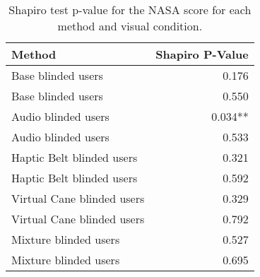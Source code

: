 
\begin{table}[!htb]
\centering
\caption{Shapiro test p-value for the NASA score for each method and visual condition.}
\label{tab:shapiro_nasa_score}
\begin{tabular}{lr}
\toprule
                    Method & Shapiro P-Value \\
\midrule
        Base blinded users &           0.176 \\
        Base blinded users &           0.550 \\
       Audio blinded users &         0.034** \\
       Audio blinded users &           0.533 \\
 Haptic Belt blinded users &           0.321 \\
 Haptic Belt blinded users &           0.592 \\
Virtual Cane blinded users &           0.329 \\
Virtual Cane blinded users &           0.792 \\
     Mixture blinded users &           0.527 \\
     Mixture blinded users &           0.695 \\
\bottomrule
\end{tabular}
\end{table}

